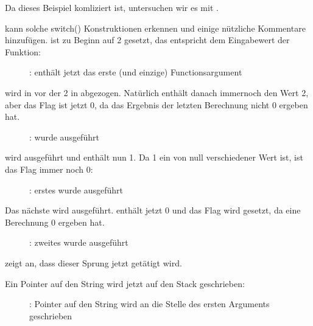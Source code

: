 \clearpage
\mysubparagraph{\olly}
Da dieses Beispiel komliziert ist, untersuchen wir es mit \olly.

\olly kann solche switch() Konstruktionen erkennen und einige nützliche Kommentare hinzufügen.
\EAX ist zu Beginn auf 2 gesetzt, das entspricht dem Eingabewert der Funktion:


\begin{figure}[H]
\centering
{}
\caption{\olly: \EAX 
enthält jetzt das erste (und einzige) Functionsargument}
\label{fig:switch_few_olly1}
\end{figure}

 wird in vor der 2 in \EAX abgezogen. Natürlich enthält \EAX danach immernoch den Wert 2, aber das \ZF Flag ist jetzt
0, da das Ergebnis der letzten Berechnung nicht 0 ergeben hat.
\begin{figure}[H]
\centering
{}
\caption{\olly: \SUB wurde ausgeführt}
\label{fig:switch_few_olly2}
\end{figure}

\clearpage
\DEC wird ausgeführt und \EAX enthält nun 1.
Da 1 ein von null verschiedener Wert ist, ist das \ZF Flag immer noch 0:

\begin{figure}[H]
\centering
{}
\caption{\olly: erstes \DEC wurde ausgeführt}
\label{fig:switch_few_olly3}
\end{figure}

\clearpage
Das nächste \DEC wird ausgeführt.
\EAX enthält jetzt 0 und das \ZF Flag wird gesetzt, da eine Berechnung 0 ergeben hat.

\begin{figure}[H]
\centering
{}
\caption{\olly: zweites \DEC wurde ausgeführt}
\label{fig:switch_few_olly4}
\end{figure}
\olly zeigt an, dass dieser Sprung jetzt getätigt wird.

\clearpage
Ein Pointer auf den String  wird jetzt auf den Stack geschrieben:

\begin{figure}[H]
\centering
{}
\caption{\olly: 
Pointer auf den String wird an die Stelle des ersten Arguments geschrieben}
\label{fig:switch_few_olly5}
\end{figure}

